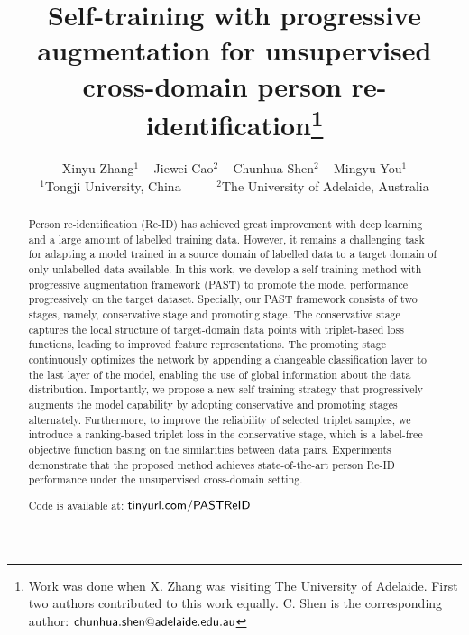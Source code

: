 \documentclass[10pt,twocolumn,letterpaper]{article}
\begin{document}
\title{Self-training with progressive augmentation  for  unsupervised cross-domain person re-identification\thanks{Work was done when X. Zhang  was visiting The University of Adelaide. 
First two authors contributed to this work equally. 
C. Shen is the corresponding author: $\sf chunhua.shen@adelaide.edu.au $
}
}

\author{
Xinyu Zhang$^{1}$ \quad  ~
Jiewei Cao$^{2}$ \quad   ~
Chunhua Shen$^{2}$ \quad ~
Mingyu You$^{1}$ \quad \\
$^{1}$Tongji University, China 
~
~
~
$^{2}$The University of Adelaide, Australia\\
}

\maketitle
\ificcvfinal\thispagestyle{empty}\fi




\begin{abstract}
Person re-identification (Re-ID) has achieved great 
improvement with deep learning and a large amount of labelled training data. 
However, it remains a  challenging task for 
adapting
a model trained in
a source domain of labelled data to a  target domain of only unlabelled data available. 
In this work, we develop a self-training method with progressive augmentation framework (PAST) to promote the model performance progressively on the target dataset. 
Specially, our PAST framework consists of two stages, namely, conservative stage and promoting stage. The conservative stage captures the local structure of target-domain data points with triplet-based loss functions, leading to improved feature representations. 
The promoting stage continuously optimizes the network 
by appending a changeable classification layer to the last layer of the model,
enabling the use of  
global information about the data distribution. 
Importantly, we propose a new self-training strategy that progressively augments the model capability
by adopting conservative and promoting stages alternately. 
Furthermore, to improve the reliability of selected triplet samples, we introduce a ranking-based triplet loss in the conservative stage, which is a label-free objective function basing on the similarities between data pairs.
Experiments demonstrate that the proposed method achieves state-of-the-art person Re-ID performance under the unsupervised cross-domain setting.

Code is available at: \href{https://tinyurl.com/PASTReID}{{ $\sf tinyurl.com/PASTReID$}}
\end{abstract}
\end{document}
